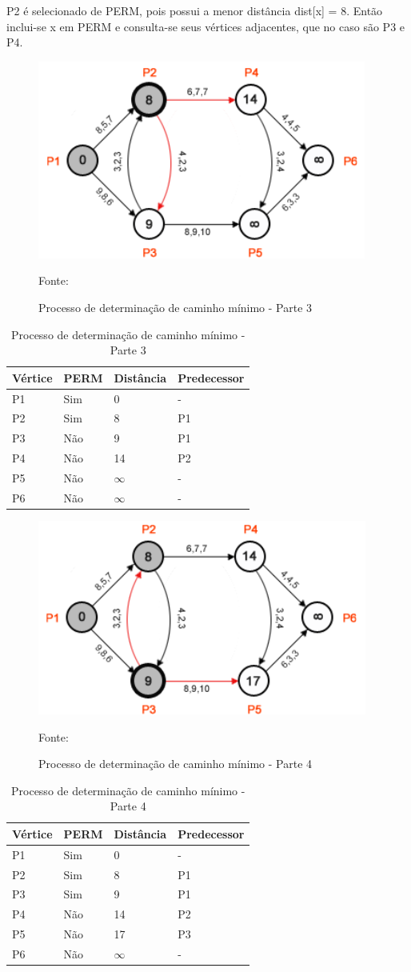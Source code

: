 P2 é selecionado de PERM, pois possui a menor distância dist[x] = 8. Então inclui-se x em PERM e consulta-se
seus vértices adjacentes, que no caso são P3 e P4.

\begin{figure}[htbp]
\centering
 \includegraphics[width=.50\textwidth]{chapters/fig/leo4.png}
\caption{Processo de determinação de caminho mínimo - Parte 3}
Fonte: \cite{leonard}
\label{fig:leo4}
\end{figure}
\FloatBarrier
\begin{table}[htbp]
	\centering
	\begin{tabular}{l l l l}
	\toprule
	Vértice & PERM & Distância & Predecessor\\
	\midrule
	P1 & Sim & 0 & - \\
	P2 & Sim & 8 & P1 \\
	P3 & Não & 9 & P1 \\
	P4 & Não & 14 & P2 \\
	P5 & Não & $\infty$ & - \\
	P6 & Não & $\infty$ & - \\
	\bottomrule
	\end{tabular}
\caption{Processo de determinação de caminho mínimo - Parte 3}
 \label{tab:leotab3}
\end{table}

\begin{figure}[htbp]
\centering
 \includegraphics[width=.50\textwidth]{chapters/fig/leo5.png}
\caption{Processo de determinação de caminho mínimo - Parte 4}
Fonte: \cite{leonard}
\label{fig:leo5}
\end{figure}
\FloatBarrier
\begin{table}[htbp]
	\centering
	\begin{tabular}{l l l l}
	\toprule
	Vértice & PERM & Distância & Predecessor\\
	\midrule
	P1 & Sim & 0 & - \\
	P2 & Sim & 8 & P1 \\
	P3 & Sim & 9 & P1 \\
	P4 & Não & 14 & P2 \\
	P5 & Não & 17 & P3 \\
	P6 & Não & $\infty$ & - \\
	\bottomrule
	\end{tabular}
\caption{Processo de determinação de caminho mínimo - Parte 4}
 \label{tab:leotab4}
\end{table}

